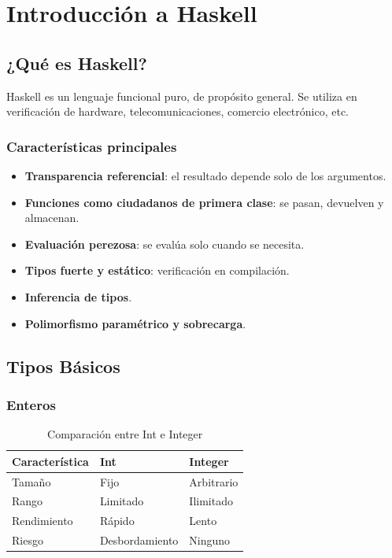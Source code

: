 \chapter{Introducción a Haskell}

\section{¿Qué es Haskell?}
Haskell es un lenguaje funcional puro, de propósito general. Se utiliza en verificación de hardware, telecomunicaciones, comercio electrónico, etc.

\subsection{Características principales}
\begin{itemize}
  \item \textbf{Transparencia referencial}: el resultado depende solo de los argumentos.
  \item \textbf{Funciones como ciudadanos de primera clase}: se pasan, devuelven y almacenan.
  \item \textbf{Evaluación perezosa}: se evalúa solo cuando se necesita.
  \item \textbf{Tipos fuerte y estático}: verificación en compilación.
  \item \textbf{Inferencia de tipos}.
  \item \textbf{Polimorfismo paramétrico y sobrecarga}.
\end{itemize}

\section{Tipos Básicos}

\subsection{Enteros}
\begin{table}[h]
\centering
\begin{tabular}{|l|p{5cm}|p{5cm}|}
\hline
\textbf{Característica} & \textbf{Int} & \textbf{Integer} \\
\hline
Tamaño & Fijo & Arbitrario \\
Rango & Limitado & Ilimitado \\
Rendimiento & Rápido & Lento \\
Riesgo & Desbordamiento & Ninguno \\
\hline
\end{tabular}
\caption{Comparación entre Int e Integer}
\end{table}

